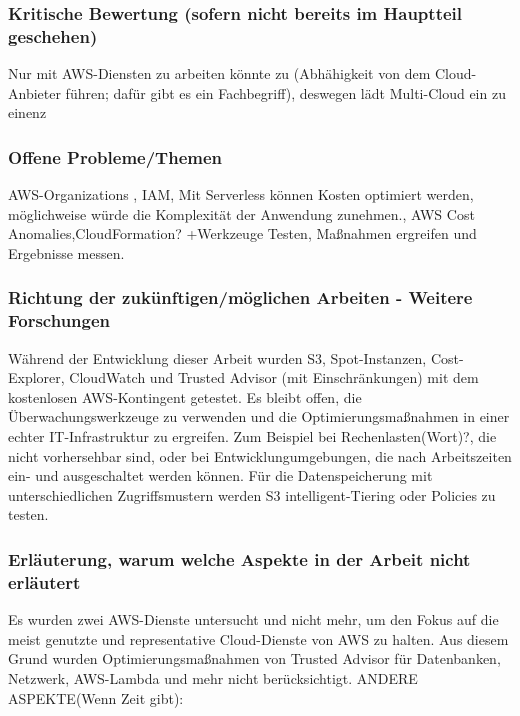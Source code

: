 \subsubsection*{Kritische Bewertung (sofern nicht bereits im Hauptteil geschehen)}
Nur mit AWS-Diensten zu arbeiten könnte zu (Abhähigkeit von dem Cloud-Anbieter führen; dafür gibt es ein Fachbegriff), deswegen lädt Multi-Cloud ein zu einenz

\subsubsection*{Offene Probleme/Themen}
AWS-Organizations%
, IAM, Mit Serverless können Kosten optimiert werden, möglichweise würde die Komplexität der Anwendung zunehmen.,  AWS Cost Anomalies,CloudFormation?
+Werkzeuge Testen, Maßnahmen ergreifen und Ergebnisse messen.
\subsubsection*{Richtung der zukünftigen/möglichen Arbeiten - Weitere Forschungen}
Während der Entwicklung dieser Arbeit wurden S3, Spot-Instanzen, Cost-Explorer, CloudWatch und Trusted Advisor (mit Einschränkungen) mit dem kostenlosen AWS-Kontingent getestet. 
Es bleibt offen, die Überwachungswerkzeuge zu verwenden und die Optimierungsmaßnahmen in einer echter IT-Infrastruktur zu ergreifen. 
Zum Beispiel bei Rechenlasten(Wort)?, die nicht vorhersehbar sind, oder bei Entwicklungumgebungen, die nach Arbeitszeiten ein- und ausgeschaltet werden können. Für die Datenspeicherung mit unterschiedlichen Zugriffsmustern werden S3 intelligent-Tiering oder Policies zu testen.%

\subsubsection*{Erläuterung, warum welche Aspekte in der Arbeit nicht erläutert} 
Es wurden zwei AWS-Dienste untersucht und nicht mehr, um den Fokus auf die meist genutzte und representative Cloud-Dienste von AWS zu halten. Aus diesem Grund wurden Optimierungsmaßnahmen von Trusted Advisor für Datenbanken, Netzwerk, AWS-Lambda und mehr nicht berücksichtigt.
ANDERE ASPEKTE(Wenn Zeit gibt):\\

